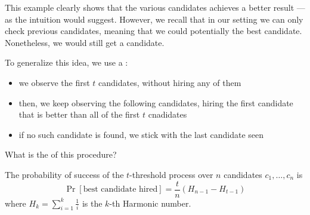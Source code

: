 \documentclass[a4paper, 12pt]{report}
\begin{document}
    This example clearly shows that  the various candidates achieves a better result --- as the intuition would suggest. However, we recall that in our setting we can only check previous candidates, meaning that we could potentially  the best candidate. Nonetheless, we would still get a  candidate.

    To generalize this idea, we use a :

    \begin{itemize}
        \item we observe the first $t$ candidates, without hiring any of them
        \item then, we keep observing the following candidates, hiring the first candidate that is better than all of the first $t$ cnadidates
        \item if no such candidate is found, we stick with the last candidate seen
    \end{itemize}

    What is the  of this procedure?

    \begin{framedlem}{}
        The probability of success of the $t$-threshold process over $n$ candidates $c_1, \ldots, c_n$ is $$\Pr[\mbox{best candidate hired}] = \dfrac{t}{n}(H_{n - 1} - H_{t - 1})$$ where $H_k = \sum_{i = 1}^k{\tfrac{1}{i}}$ is the $k$-th Harmonic number.
    \end{framedlem}
\end{document}
